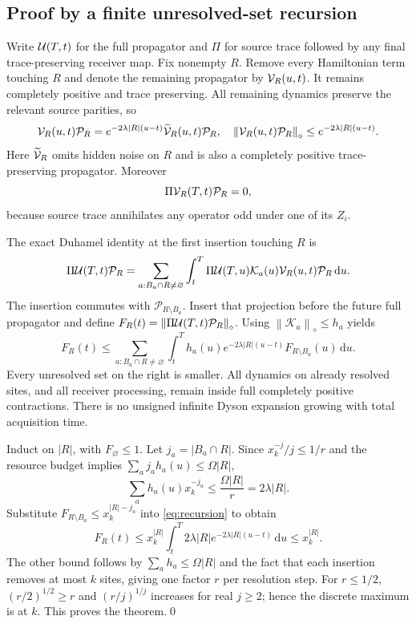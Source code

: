 \documentclass[11pt,a4paper]{article}
\newcommand{\norm}[1]{\left\lVert #1\right\rVert}
\newcommand{\calK}{\mathcal K}\newcommand{\calP}{\mathcal P}\newcommand{\calZ}{\mathcal Z}\newcommand{\calG}{\mathcal G}
\begin{document}
\subsection{Proof by a finite unresolved-set recursion}

Write $\mathcal U(T,t)$ for the full propagator and $\Pi$ for source trace followed by any final trace-preserving receiver map. Fix nonempty $R$. Remove every Hamiltonian term touching $R$ and denote the remaining propagator by $\mathcal V_R(u,t)$. It remains completely positive and trace preserving. All remaining dynamics preserve the relevant source parities, so
\begin{equation}
\calV_R(u,t)\calP_R=e^{-2\lambda|R|(u-t)}\widetilde{\calV}_R(u,t)\calP_R,
\quad\norm{\calV_R(u,t)\calP_R}_\diamond\le e^{-2\lambda|R|(u-t)}.
\label{eq:free}
\end{equation}
Here $\widetilde{\mathcal V}_R$ omits hidden noise on $R$ and is also a completely positive trace-preserving propagator. Moreover
\begin{equation}
\Pi\calV_R(T,t)\calP_R=0,
\end{equation}
because source trace annihilates any operator odd under one of its $Z_i$.

The exact Duhamel identity at the first insertion touching $R$ is
\begin{equation}
\Pi\calU(T,t)\calP_R=
\sum_{a:B_a\cap R\ne\varnothing}\int_t^T
\Pi\calU(T,u)\calK_a(u)\calV_R(u,t)\calP_R\,\mathrm du.
\label{eq:duhamel}
\end{equation}
The insertion commutes with $\calP_{R\setminus B_a}$. Insert that projection before the future full propagator and define $F_R(t)=\norm{\Pi\calU(T,t)\calP_R}_\diamond$. Using $\norm{\calK_a}_\diamond\le h_a$ yields
\begin{equation}
F_R(t)\le\sum_{a:B_a\cap R\ne\varnothing}\int_t^T
h_a(u)e^{-2\lambda|R|(u-t)}F_{R\setminus B_a}(u)\,\mathrm du.
\label{eq:recursion}
\end{equation}
Every unresolved set on the right is smaller. All dynamics on already resolved sites, and all receiver processing, remain inside full completely positive contractions. There is no unsigned infinite Dyson expansion growing with total acquisition time.

Induct on $|R|$, with $F_\varnothing\le1$. Let $j_a=|B_a\cap R|$. Since $x_k^{-j}/j\le1/r$ and the resource budget implies $\sum_a j_a h_a(u)\le\Omega|R|$,
\begin{equation}
\sum_a h_a(u)x_k^{-j_a}\le\frac{\Omega|R|}{r}=2\lambda|R|.
\end{equation}
Substitute $F_{R\setminus B_a}\le x_k^{|R|-j_a}$ into \eqref{eq:recursion} to obtain
\begin{equation}
F_R(t)\le x_k^{|R|}\int_t^T2\lambda|R|e^{-2\lambda|R|(u-t)}\,\mathrm du\le x_k^{|R|}.
\end{equation}
The other bound follows by $\sum_a h_a\le\Omega|R|$ and the fact that each insertion removes at most $k$ sites, giving one factor $r$ per resolution step. For $r\le1/2$, $(r/2)^{1/2}\ge r$ and $(r/j)^{1/j}$ increases for real $j\ge2$; hence the discrete maximum is at $k$. This proves the theorem.\qed
\end{document}
